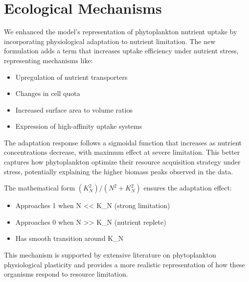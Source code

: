 \section{Ecological Mechanisms}

We enhanced the model's representation of phytoplankton nutrient uptake by incorporating physiological adaptation to nutrient limitation. The new formulation adds a term that increases uptake efficiency under nutrient stress, representing mechanisms like:

\begin{itemize}
\item Upregulation of nutrient transporters
\item Changes in cell quota
\item Increased surface area to volume ratios
\item Expression of high-affinity uptake systems
\end{itemize}

The adaptation response follows a sigmoidal function that increases as nutrient concentrations decrease, with maximum effect at severe limitation. This better captures how phytoplankton optimize their resource acquisition strategy under stress, potentially explaining the higher biomass peaks observed in the data.

The mathematical form $(K_N^2)/(N^2 + K_N^2)$ ensures the adaptation effect:
\begin{itemize}
\item Approaches 1 when N << K_N (strong limitation)
\item Approaches 0 when N >> K_N (nutrient replete)
\item Has smooth transition around K_N
\end{itemize}

This mechanism is supported by extensive literature on phytoplankton physiological plasticity and provides a more realistic representation of how these organisms respond to resource limitation.

